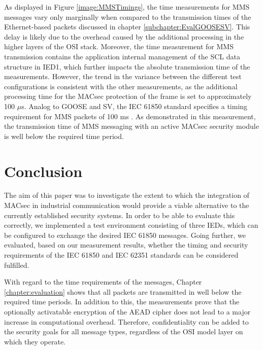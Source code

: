 \documentclass[conference, onecolumn, a4paper]{IEEEtran}
\begin{document}
\noindent As displayed in Figure \ref{image:MMSTimings}, the time measurements for MMS messages vary only marginally when compared to the transmission 
times of the Ethernet-based packets discussed in chapter \ref{subchapter:EvalGOOSESV}. This delay is likely due to the overhead caused by the additional 
processing in the higher layers of the OSI stack. Moreover, the time measurement for MMS transmission contains the application internal management of 
the SCL data structure in IED1, which further impacts the absolute transmission time of the measurements. However, the trend in the variance between 
the different test configurations is consistent with the other measurements, as the additional processing time for the MACsec protection of the frame 
is set to approximately 100 $\mu$s. Analog to GOOSE and SV, the IEC 61850 standard specifies a timing requirement for MMS packets of 100 ms 
\cite{fixedLatencyGOOSESV:2021}. As demonstrated in this measurement, the transmission time of MMS messaging with an active MACsec security module is 
well below the required time period. 

\section{Conclusion}
\label{chapter:conclusion}
\noindent The aim of this paper was to investigate the extent to which the integration of MACsec in industrial communication would provide a viable 
alternative to the currently established security systems. In order to be able to evaluate this correctly, we implemented a test environment  
consisting of three IEDs, which can be configured to exchange the desired IEC 61850 messages. Going further, we evaluated, based on 
our measurement results, whether the timing and security requirements of the IEC 61850 and IEC 62351 standards can be considered fulfilled.  

\smallskip
With regard to the time requirements of the messages, Chapter \ref{chapter:evaluation} shows that all packets are transmitted in well below the required 
time periods. In addition to this, the measurements prove that the optionally activatable encryption of the AEAD cipher does not lead to a major increase 
in computational overhead. Therefore, confidentiality can be added to the security goals for all message types, regardless of the OSI model layer on which 
they operate. 
\end{document}
